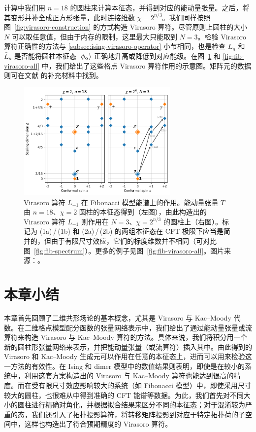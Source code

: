 计算中我们用 $n=18$ 的圆柱来计算本征态，并得到对应的能动量张量。之后，将其变形并补全成正方形张量，此时连接维数 $\chi=2^{n/3}$。我们同样按照图~\ref{fig:virasoro-construction} 的方式构造 Virasoro 算符。尽管原则上圆柱的大小 $N$ 可以取任意值，但由于内存的限制，这里最大只能取到 $N=3$。检验 Virasoro 算符正确性的方法与 \ref{subsec:ising-virasoro-operator} 小节相同，也是检查 $L_n$ 和 $\bar{L}_n$ 是否能将圆柱本征态 $\ket*{\phi_\alpha}$ 正确地升高或降低到对应能级。在图~\ref{fig:fib-virasoro} 和 \ref{fig:fib-virasoro-all} 中，我们给出了这些格点 Virasoro 算符作用的示意图。矩阵元的数据则可在文献 \parencite{zeng2023virasoro} 的补充材料中找到。

\begin{figure}[ht]
  \centering
  \includegraphics[width=0.7\textwidth]{images/fibonacci/fib-virasoro.pdf}
  \caption[Virasoro 算符在 Fibonacci 模型能谱上的作用]{Virasoro 算符 $L_{-1}$ 在 Fibonacci 模型能谱上的作用。能动量张量 $T$ 由 $n=18$、$\chi=2$ 圆柱的本征态得到（左图），由此构造出的 Virasoro 算符 $L_{-1}$ 则作用在 $N=3$、$\chi=2^{n/3}$ 的圆柱上（右图）。标记为 (1a)\,/\,(1b) 和 (2a)\,/\,(2b) 的两组本征态在 CFT 极限下应当是简并的，但由于有限尺寸效应，它们的标度维数并不相同（可对比图~\ref{fig:fib-spectrum}）。更多的例子见图~\ref{fig:fib-virasoro-all}。图片来源：\parencite{zeng2023virasoro}。}
  \label{fig:fib-virasoro}
\end{figure}

\section{本章小结}

本章首先回顾了二维共形场论的基本概念，尤其是 Virasoro 与 Kac--Moody 代数。在二维格点模型配分函数的张量网络表示中，我们给出了通过能动量张量或流算符来构造 Virasoro 与 Kac--Moody 算符的方法。具体来说，我们将积分用一个新的圆柱形张量网络来表示，并把能动量张量（或流算符）插入其中。由此得到的 Virasoro 和 Kac--Moody 生成元可以作用在任意的本征态上，进而可以用来检验这一方法的有效性。在 Ising 和 dimer 模型中的数值结果则表明，即使是在较小的系统中，利用这套方案构造出的 Virasoro 与 Kac--Moody 算符也能达到很高的精度。而在受有限尺寸效应影响较大的系统（如 Fibonacci 模型）中，即使采用尺寸较大的圆柱，也很难从中得到准确的 CFT 能谱等数据。为此，我们首先对不同大小的圆柱进行精确对角化，并根据拟合结果来区分不同的本征态；对于混淆较为严重的态，我们还引入了拓扑投影算符，将转移矩阵投影到对应于特定拓扑荷的子空间中，这样也构造出了符合预期精度的 Virasoro 算符。
